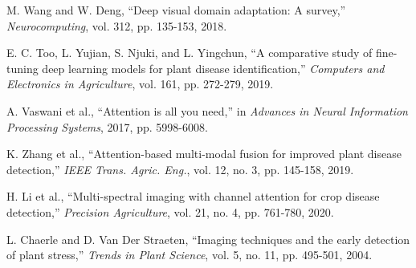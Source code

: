 \documentclass[conference]{IEEEtran}
\begin{document}
\begin{thebibliography}{00}
 M. Wang and W. Deng, ``Deep visual domain adaptation: A survey,'' \textit{Neurocomputing}, vol. 312, pp. 135-153, 2018.

 E. C. Too, L. Yujian, S. Njuki, and L. Yingchun, ``A comparative study of fine-tuning deep learning models for plant disease identification,'' \textit{Computers and Electronics in Agriculture}, vol. 161, pp. 272-279, 2019.

 A. Vaswani et al., ``Attention is all you need,'' in \textit{Advances in Neural Information Processing Systems}, 2017, pp. 5998-6008.

 K. Zhang et al., ``Attention-based multi-modal fusion for improved plant disease detection,'' \textit{IEEE Trans. Agric. Eng.}, vol. 12, no. 3, pp. 145-158, 2019.

 H. Li et al., ``Multi-spectral imaging with channel attention for crop disease detection,'' \textit{Precision Agriculture}, vol. 21, no. 4, pp. 761-780, 2020.

 L. Chaerle and D. Van Der Straeten, ``Imaging techniques and the early detection of plant stress,'' \textit{Trends in Plant Science}, vol. 5, no. 11, pp. 495-501, 2004.

\end{thebibliography}
\end{document}
